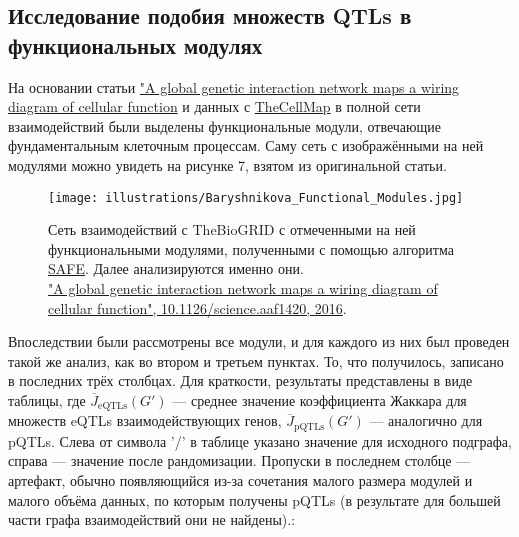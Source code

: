 \documentclass[11pt,a4paper]{report}
\theoremstyle{definition}
\theoremstyle{definition}
\theoremstyle{definition}
\begin{document}
	\subsection{Исследование подобия множеств QTLs в функциональных модулях}
	 На основании статьи \href{https://labs.genetics.ucla.edu/kruglyak/home}{"A global genetic interaction network maps a wiring diagram of cellular function} и данных с \href{http://thecellmap.org/?q=null#}{TheCellMap} в полной сети взаимодействий были выделены функциональные модули, отвечающие фундаментальным клеточным процессам. Саму сеть с изображёнными на ней модулями можно увидеть на рисунке 7, взятом из оригинальной статьи.
		\begin{figure}[H]
			\centering
			\caption{Сеть взаимодействий с TheBioGRID с отмеченными на ней функциональными модулями, полученными с помощью алгоритма \href{http://science.sciencemag.org/content/353/6306/aaf1420}{SAFE}. Далее анализируются именно они.\\ 
			\href{http://science.sciencemag.org/content/353/6306/aaf1420}{"A global genetic interaction network maps a wiring diagram of cellular function", 10.1126/science.aaf1420, 2016}. }
			\texttt{[image: illustrations/Baryshnikova\_Functional\_Modules.jpg]}
		\end{figure}
		Впоследствии были рассмотрены все модули, и для каждого из них был проведен такой же анализ, как во втором и третьем пунктах. То, что получилось, записано в последних трёх столбцах. Для краткости, результаты представлены в виде таблицы, где $\overline{J}_{\text{eQTLs}}(G')$ — среднее значение коэффициента Жаккара для множеств eQTLs взаимодействующих генов, $\overline{J}_{\text{pQTLs}} (G') $ — аналогично для pQTLs. Слева от символа '/' в таблице указано значение для исходного подграфа, справа — значение после рандомизации. Пропуски в последнем столбце — артефакт, обычно появляющийся из-за сочетания малого размера модулей и малого объёма данных, по которым получены pQTLs (в результате для большей части графа взаимодействий они не найдены).:\\
\end{document}
